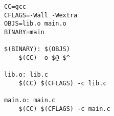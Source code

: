\begin{lstlisting}
CC=gcc
CFLAGS=-Wall -Wextra
OBJS=lib.o main.o
BINARY=main

$(BINARY): $(OBJS)
    $(CC) -o $@ $^ 

lib.o: lib.c
    $(CC) $(CFLAGS) -c lib.c

main.o: main.c 
    $(CC) $(CFLAGS) -c main.c\end{lstlisting}
